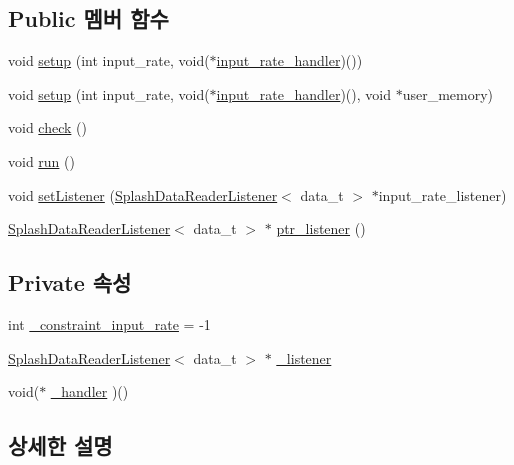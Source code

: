 \subsection*{Public 멤버 함수}
\begin{DoxyCompactItemize}
\item 
void \hyperlink{classInputRateMonitor__PB_ab37591b8f43422bacbaab7ce4b8ba7e7}{setup} (int input\+\_\+rate, void($\ast$\hyperlink{sample__main_8cpp_a57c221f281c346c72b89c10137fea994}{input\+\_\+rate\+\_\+handler})())
\item 
void \hyperlink{classInputRateMonitor__PB_aea065d055e3cb4ec2221a7c95e12a98f}{setup} (int input\+\_\+rate, void($\ast$\hyperlink{sample__main_8cpp_a57c221f281c346c72b89c10137fea994}{input\+\_\+rate\+\_\+handler})(), void $\ast$user\+\_\+memory)
\item 
void \hyperlink{classInputRateMonitor__PB_a7f912ff558127c5a951c186c0c9ad2ee}{check} ()
\item 
void \hyperlink{classInputRateMonitor__PB_a078f5a23b3fff392b7f50a9d376ded0b}{run} ()
\item 
void \hyperlink{classInputRateMonitor__PB_a3e62dd99866737bf5f7be82c16433940}{set\+Listener} (\hyperlink{classSplashDataReaderListener}{Splash\+Data\+Reader\+Listener}$<$ data\+\_\+t $>$ $\ast$input\+\_\+rate\+\_\+listener)
\item 
\hyperlink{classSplashDataReaderListener}{Splash\+Data\+Reader\+Listener}$<$ data\+\_\+t $>$ $\ast$ \hyperlink{classInputRateMonitor__PB_a7fd5f7e9be9ab5f62f2122ed5f43100a}{ptr\+\_\+listener} ()
\end{DoxyCompactItemize}
\subsection*{Private 속성}
\begin{DoxyCompactItemize}
\item 
int \hyperlink{classInputRateMonitor__PB_a1294a164e2a5c966599d0802cf4fed24}{\+\_\+constraint\+\_\+input\+\_\+rate} = -\/1
\item 
\hyperlink{classSplashDataReaderListener}{Splash\+Data\+Reader\+Listener}$<$ data\+\_\+t $>$ $\ast$ \hyperlink{classInputRateMonitor__PB_a5d9bb568b165fe454daced915ecc6c7e}{\+\_\+listener}
\item 
void($\ast$ \hyperlink{classInputRateMonitor__PB_ab8e00bdce1779070b9587f477ee281a7}{\+\_\+handler} )()
\end{DoxyCompactItemize}


\subsection{상세한 설명}
